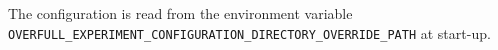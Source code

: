 \documentclass{article}
\begin{document}
The configuration is read from the environment variable
\texttt{OVERFULL\_EXPERIMENT\_CONFIGURATION\_DIRECTORY\_OVERRIDE\_PATH} at start-up.
\end{document}
